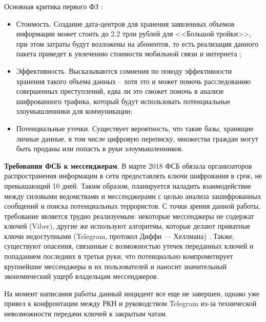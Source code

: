 	Основная критика первого ФЗ :
	\begin{itemize}
		\item Стоимость. Создание дата-центров для хранения заявленных объемов информации может стоить до 2.2 трлн рублей для <<Большой тройки>>, при этом затраты будут возложены на абонентов, то есть реализация данного пакета приведет  к увлечению стоимости мобильной  связи и интернета \cite{Yar1}; %
		\item Эффективность. Высказываются сомнения по поводу эффективности хранения такого объема данных -- хотя это и может помочь расследованию совершенных преступлений, едва ли это сможет помочь в анализе шифрованного трафика, который будут использовать потенциальные злоумышленники для коммуникации;
		\item Потенциальные утечки. Существует  вероятность, что такие базы, хранящие личные данные, в том числе цифровую переписку, множества граждан могут быть проданы или попасть в руки злоумышленников.    
	\end{itemize}
	
	
	\textbf{Требования ФСБ к мессенджерам}. В марте 2018 ФСБ обязала организаторов распространения информации в сети предоставлять ключи шифрования в срок, не превышающий 10 дней. %
	Таким образом, планируется наладить взаимодействие между силовыми ведомствами и мессенджерами  с целью анализа зашифрованных сообщений и поиска потенциальных террористов. С точки зрения данной работы, требование является трудно реализуемым: некоторые мессенджеры  не содержат ключей (Viber), другие же используют алгоритмы, которые делают приватные ключи недоступными (Telegram, протокол Диффи — Хеллмана) \cite{Yar2}. %
	Также, существуют опасения, связанные с возможностью утечек переданных ключей  и попаданием последних в третьи руки, что потенциально компрометирует крупнейшие мессенджеры и их пользователей и наносит значительный экономический ущерб владельцам мессенджеров.
	
	На момент написания работы данный инцидент все еще не завершен, однако уже привел к конфронтации между РКН и руководством Telegram из-за технической невозможности передачи ключей к закрытым чатам. 
\newpage